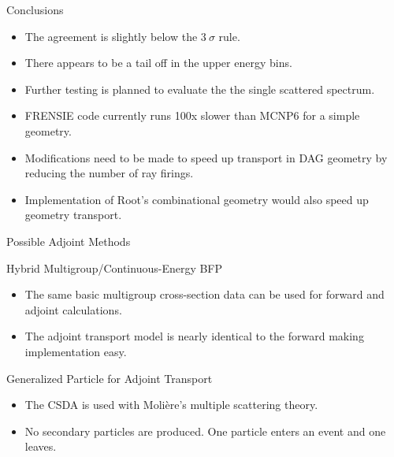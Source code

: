 \documentclass{beamer}
\begin{document}
\begin{frame}{Conclusions}
 
    \begin{itemize}
      \item The agreement is slightly below the $3~\sigma$ rule.
      
      \item There appears to be a tail off in the upper energy bins.
       
      \item Further testing is planned to evaluate the the single scattered spectrum.
  
      \item FRENSIE code currently runs 100x slower than MCNP6 for a simple geometry.
      
      \item Modifications need to be made to speed up transport in DAG geometry by reducing the number of ray firings.
      
      \item Implementation of Root's combinational geometry would also speed up geometry transport.
       
    \end{itemize}
\end{frame}

\begin{frame}{Possible Adjoint Methods}
  \begin{block}{Hybrid Multigroup/Continuous-Energy BFP}
 
    \begin{itemize}
      \item The same basic multigroup cross-section data can be used for forward and adjoint calculations. 
       
      \item The adjoint transport model is nearly identical to the forward making implementation easy.
    \end{itemize}
  \end{block}
  
  \begin{block}{Generalized Particle for Adjoint Transport}
    \begin{itemize}
        \item The CSDA is used with Moli\`{e}re's multiple scattering theory.
       
         \item No secondary particles are produced. One particle enters an event and one leaves.
    \end{itemize}
  \end{block}


\end{frame}
\end{document}
